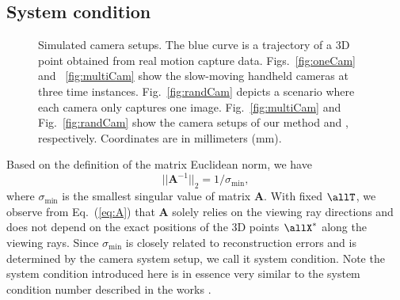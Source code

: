 \subsection{System condition} \label{sec:system_condition}
\begin{figure}[t]
\centering
{}
\caption{Simulated camera setups. The blue curve is a trajectory of a 3D point obtained from real motion capture data. Figs.~\ref{fig:oneCam} and ~\ref{fig:multiCam} show the slow-moving handheld cameras at three time instances. Fig.~\ref{fig:randCam} depicts a scenario where each camera only captures one image.
Fig.~\ref{fig:multiCam} and Fig.~\ref{fig:randCam} show the camera setups of our method and \cite{zheng2014joint}, respectively. Coordinates are in millimeters (mm).
}
\label{fig:condition}
\end{figure}

Based on the definition of the matrix Euclidean norm, we have
\begin{equation}
||\mathbf{A}^{-1}||_2 = 1/\sigma_{\text{min}}, 
\label{eq:sysCondition}
\end{equation}
where $\sigma_{\text{min}}$ is the smallest singular value of matrix $\mathbf{A}$. 
With fixed $\allT$, we observe from Eq.~(\ref{eq:A}) that $\mathbf{A}$ solely relies on the viewing ray directions and does not depend on the exact positions of the 3D points $\allX^*$ along the viewing rays.
Since $\sigma_{\text{min}}$ is closely related to reconstruction errors and is determined by the camera system setup, we call it system condition. 
Note the system condition introduced here is in essence very similar to the system condition number described in the works \cite{Valmadre_CVPR2012,zheng2014joint}.


